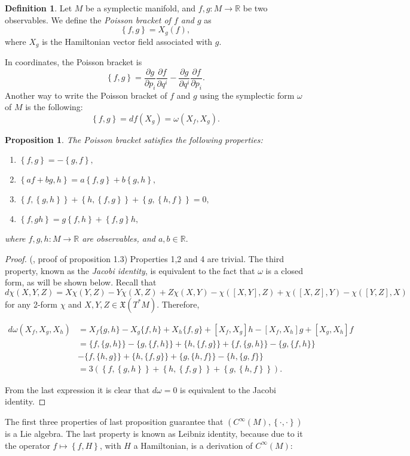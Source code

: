\documentclass[12pt, letterpaper, reqno]{amsart}
\theoremstyle{definition}
\newtheorem{df}{Definition}
\theoremstyle{plain}
\newtheorem{prop}{Proposition}
\theoremstyle{remark}
\begin{document}
\begin{df}
	Let $ M $ be a symplectic manifold, and $ f,g: M \rightarrow \mathbb{R} $ be two observables. We define the \textit{Poisson bracket of $ f $ and $ g $ } as 
	$$ \left\{ f,g \right\}= X_g(f),$$ 
	where $ X_g  $ is the Hamiltonian vector field associated with $ g. $ 
\end{df}
In coordinates, the Poisson bracket is 
$$ \left\{ f,g \right\} = \frac{\partial g}{\partial p_i}\frac{\partial f}{\partial q^i} - \frac{\partial g}{\partial q^i} \frac{\partial f}{\partial p_i}.   $$ 
Another way to write the Poisson bracket of $ f $ and $ g $ using the symplectic form $ \omega $ of $M$ is the following:
$$ \left\{ f,g \right\} = df(X_g)=\omega (X_f,X_g). $$ 
\begin{prop}
	The Poisson bracket satisfies the following properties:
	\begin{enumerate}
		\item $ \left\{ f,g \right\} = -\left\{ g,f \right\},$ 
		\item $ \left\{ af+bg,h \right\} = a\left\{ f,g \right\}+ b \left\{ g,h \right\} ,   $ 
		\item $ \left\{ f, \left\{ g,h \right\}  \right\} +\left\{ h, \left\{ f,g \right\}  \right\} + \left\{ g, \left\{ h,f \right\}  \right\} =0, $  
		\item $ \left\{ f,gh \right\} =g \left\{ f,h \right\} + \left\{ f,g \right\} h,$ 
	\end{enumerate}
	where $ f,g,h: M \rightarrow \mathbb{R} $ are observables, and $ a,b\in \mathbb{R}. $ 
\end{prop}
\begin{proof}
	(\cite{poisson}, proof of proposition 1.3) Properties 1,2 and 4 are trivial. The third property, known as the \textit{Jacobi identity},  is equivalent to the fact that $ \omega $ is a closed form, as will be shown below. Recall that $$ d\chi(X,Y,Z)=X\chi(Y,Z)-Y\chi(X,Z)+Z\chi(X,Y)-\chi([X,Y],Z)+\chi([X,Z],Y)-\chi([Y,Z],X) $$ 
	for any 2-form $ \chi $ and $ X,Y,Z\in \mathfrak{X}(T^*M). $ Therefore, 
	

$\begin{aligned}
	d \omega\left(X_{f}, X_{g}, X_{h}\right) &=X_{f}\{g, h\}-X_{g}\{f, h\}+X_{h}\{f, g\}+\left[X_{f}, X_{g}\right] h-\left[X_{f}, X_{h}\right] g+\left[X_{g}, X_{h}\right] f \\
&=\{f,\{g, h\}\}-\{g,\{f, h\}\}+\{h,\{f, g\}\}+\{f,\{g, h\}\}-\{g,\{f, h\}\} \\
&-\{f,\{h, g\}\}+\{h,\{f, g\}\}+\{g,\{h, f\}\}-\{h,\{g, f\}\} \\
&=3 \left( \left\{ f, \left\{ g,h \right\}  \right\} +\left\{ h, \left\{ f,g \right\}  \right\} + \left\{ g, \left\{ h,f \right\}  \right\}\right).  
\end{aligned}$

From the last expression it is clear that $ d\omega=0 $ is equivalent to the Jacobi identity.
\end{proof}
The first three properties of last proposition guarantee that $ \left( C^\infty(M), \left\{ \cdot,\cdot \right\}  \right) $ is a Lie algebra. The last property is known as Leibniz identity, because due to it the operator $ f\mapsto \left\{ f,H \right\}  $, with $ H $ a Hamiltonian, is a derivation of $ C^\infty(M): $ 
\end{document}

